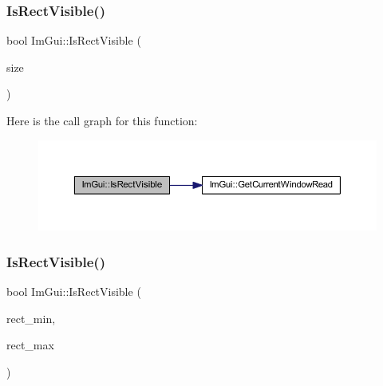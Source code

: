 \mbox{\label{namespace_im_gui_a578ead6237b3ed05497ed361f18d9f97}} 
\subsubsection{\texorpdfstring{Is\+Rect\+Visible()}{IsRectVisible()}\hspace{0.1cm}{\footnotesize\ttfamily [1/2]}}
{\footnotesize\ttfamily bool Im\+Gui\+::\+Is\+Rect\+Visible (\begin{DoxyParamCaption}\item[{const \mbox{\hyperlink{struct_im_vec2}{Im\+Vec2}} \&}]{size }\end{DoxyParamCaption})}

Here is the call graph for this function\+:
\nopagebreak
\begin{figure}[H]
\begin{center}
\leavevmode
\includegraphics[width=350pt]{namespace_im_gui_a578ead6237b3ed05497ed361f18d9f97_cgraph}
\end{center}
\end{figure}
\mbox{\label{namespace_im_gui_a5aca7e6939e07caaca489aa8c776fd81}} 
\subsubsection{\texorpdfstring{Is\+Rect\+Visible()}{IsRectVisible()}\hspace{0.1cm}{\footnotesize\ttfamily [2/2]}}
{\footnotesize\ttfamily bool Im\+Gui\+::\+Is\+Rect\+Visible (\begin{DoxyParamCaption}\item[{const \mbox{\hyperlink{struct_im_vec2}{Im\+Vec2}} \&}]{rect\+\_\+min,  }\item[{const \mbox{\hyperlink{struct_im_vec2}{Im\+Vec2}} \&}]{rect\+\_\+max }\end{DoxyParamCaption})}

